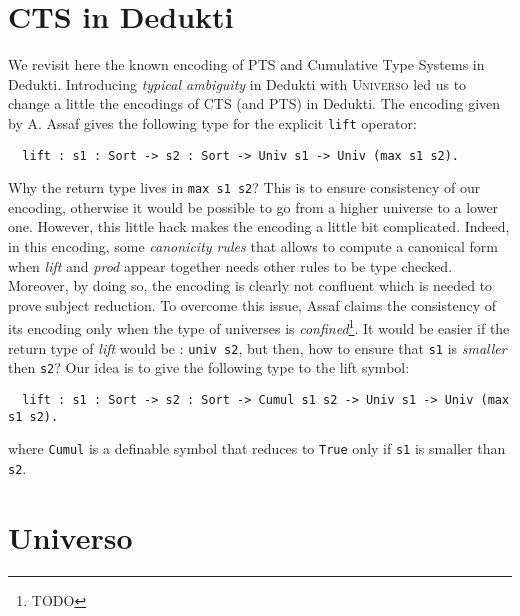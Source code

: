 \documentclass[conference]{IEEEtran}
\newcommand{\universo}{\textsc{Universo}}
\begin{document}

%

\section{CTS in Dedukti}

We revisit here the known encoding of PTS and Cumulative Type Systems in Dedukti. Introducing \textit{typical ambiguity} in Dedukti with \universo{} led us to change a little the encodings of CTS (and PTS) in Dedukti. The encoding given by A. Assaf gives the following type for the explicit \texttt{lift} operator:
\begin{verbatim}
  lift : s1 : Sort -> s2 : Sort -> Univ s1 -> Univ (max s1 s2).
\end{verbatim}

Why the return type lives in \texttt{max s1 s2}? This is to ensure consistency of our encoding, otherwise it would be possible to go from a higher universe to a lower one. However, this little hack makes the encoding a little bit complicated. Indeed, in this encoding, some \textit{canonicity rules} that allows to compute a canonical form when \textit{lift} and \textit{prod} appear together needs other rules to be type checked. Moreover, by doing so, the encoding is clearly not confluent which is needed to prove subject reduction. To overcome this issue, Assaf claims the consistency of its encoding only when the type of universes is \textit{confined}\footnote{TODO}. It would be easier if the return type of \textit{lift} would be : \texttt{univ s2}, but then, how to ensure that \texttt{s1} is \textit{smaller} then \texttt{s2}? Our idea is to give the following type to the lift symbol:
\begin{verbatim}
  lift : s1 : Sort -> s2 : Sort -> Cumul s1 s2 -> Univ s1 -> Univ (max s1 s2).
\end{verbatim}
where \texttt{Cumul} is a definable symbol that reduces to \texttt{True} only if \texttt{s1} is smaller than \texttt{s2}.
\section{Universo}
\end{document}
